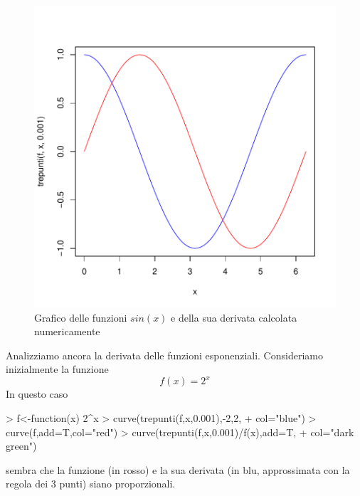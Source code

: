 \documentclass[onecolumn,11pt]{book}
\begin{document}
\begin{figure}[ htbp]
\begin{center}
\includegraphics{statisticaconR-090}
\caption{Grafico delle funzioni $sin(x)$ e della sua derivata calcolata numericamente}
\label{sincos}
\end{center}
\end{figure}
Analizziamo ancora la derivata delle funzioni esponenziali. Consideriamo inizialmente
la funzione
$$f(x)=2^x$$ 
In questo caso
\begin{Schunk}
\begin{Sinput}
> f<-function(x) 2^x
> curve(trepunti(f,x,0.001),-2,2,
+ col="blue")
> curve(f,add=T,col="red")
> curve(trepunti(f,x,0.001)/f(x),add=T,
+ col="dark green")
\end{Sinput}
\end{Schunk}
sembra che  la funzione (in rosso) e la sua derivata (in blu, approssimata con la regola dei 3 punti)   siano proporzionali.
\end{document}
